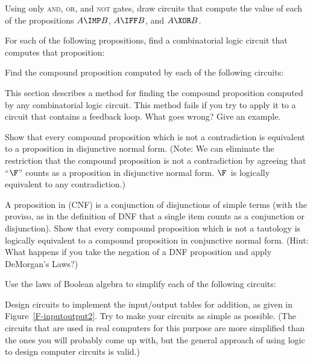 \begin{exercises}

\problem Using only \textsc{and}, \textsc{or}, and \textsc{not} gates,
draw circuits that compute the value of each of the propositions
$A\IMP B$, $A\IFF B$, and $A\XOR B$.

\problem For each of the following propositions, find a combinatorial
logic circuit that computes that proposition:

\problem Find the compound proposition computed by each of the
following circuits:
\medskip

\centerline{\qquad{}}

\problem This section describes a method for finding the compound
proposition computed by any combinatorial logic circuit.  This method
fails if you try to apply it to a circuit that contains a feedback loop.
What goes wrong?  Give an example.

\problem Show that every compound proposition which is not a contradiction
is equivalent to a proposition in disjunctive normal form.  (Note: We can
eliminate the restriction that the compound proposition is not a
contradiction by agreeing that ``$\F$'' counts as a proposition in
disjunctive normal form.  $\F$~is logically equivalent to any contradiction.)

\problem A proposition in  (CNF) is
a conjunction of disjunctions of simple terms (with the proviso, as 
in the definition of DNF that a single item counts as a conjunction
or disjunction).  Show that every 
compound proposition which is not a tautology is logically equivalent
to a compound proposition in conjunctive normal form.  (Hint:
What happens if you take the negation of a DNF proposition and
apply DeMorgan's Laws?)

\problem Use the laws of Boolean algebra to simplify each of the
following circuits:
\medskip



\problem Design circuits to implement the input/output tables
for addition, as given in Figure~\ref{F-inputoutput2}.  Try to
make your circuits as simple as possible.  (The circuits that are
used in real computers for this purpose are more simplified than
the ones you will probably come up with, but the general approach
of using logic to design computer circuits is valid.)

\end{exercises}



